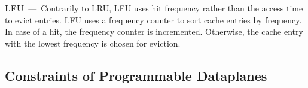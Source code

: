 
\textbf{LFU}~---~Contrarily to LRU, LFU uses hit frequency rather than the access time to evict entries.
LFU uses a frequency counter to sort cache entries by frequency.
In case of a hit, the frequency counter is incremented.
Otherwise, the cache entry with the lowest frequency is chosen for eviction.%
%


\subsection{Constraints of Programmable Dataplanes}\label{sec:constraints}

